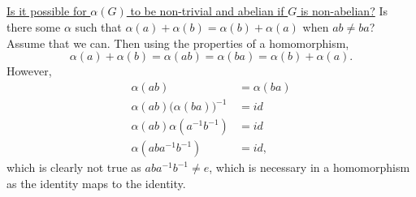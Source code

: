 \documentclass[10pt,a4paper]{report}
\begin{document}
    \subsection{}
    \underline{Is it possible for $\alpha(G)$ to be non-trivial and abelian if $G$ is non-abelian?}\newline
    \indent	Is there some $\alpha$ such that $\alpha(a)+\alpha(b)=\alpha(b)+\alpha(a)$ when $ab\neq ba$? Assume that we can. Then using the properties of a homomorphism,
    \[
    	\alpha(a)+\alpha(b)=\alpha(ab)=\alpha(ba)=\alpha(b)+\alpha(a).
    \]
    However, 
    \begin{align*}
    	\alpha(ab) &= \alpha(ba) \\
    	\alpha(ab)\bigl(\alpha(ba)\bigr)^{-1} &= id \\
    	\alpha(ab)\alpha(a^{-1}b^{-1}) &= id \\
    	\alpha(aba^{-1}b^{-1}) &= id,
    \end{align*}
    which is clearly not true as $aba^{-1}b^{-1}\neq e$, which is necessary in a homomorphism as the identity maps to the identity.
  
\end{document}

